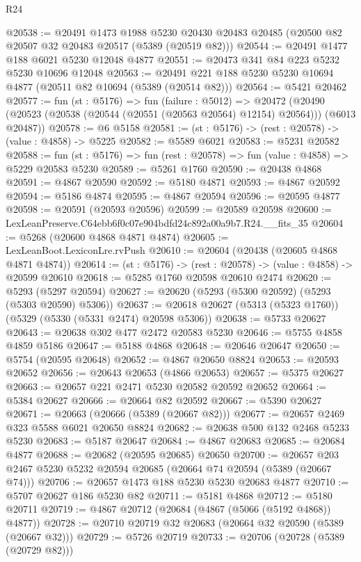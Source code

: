 \begin{lexlean}{R24}
\begin{coremodule}
@20538 := @20491
    @1473
    @1988
    @5230
    @20430
    @20483
    @20485
    (@20500 @82 @20507 @32 @20483 @20517 (@5389 (@20519 @82)))
@20544 := @20491 @1477 @188 @6021 @5230 @12048 @4877
@20551 := @20473 @341 @84 @223 @5232 @5230 @10696 @12048
@20563 := @20491 @221 @188 @5230 @5230 @10694 @4877 (@20511 @82 @10694 (@5389 (@20514 @82)))
@20564 := @5421 @20462
@20577 := fun (st : @5176) =>
  fun (failure : @5012) =>
  @20472 (@20490 (@20523 (@20538 (@20544 (@20551 (@20563 @20564) @12154) @20564))) (@6013 @20487))
@20578 := @6 @5158
@20581 := (st : @5176) -> (rest : @20578) -> (value : @4858) -> @5225
@20582 := @5589 @6021
@20583 := @5231 @20582
@20588 := fun (st : @5176) => fun (rest : @20578) => fun (value : @4858) => @5229 @20583 @5230
@20589 := @5261 @1760
@20590 := @20438 @4868
@20591 := @4867 @20590
@20592 := @5180 @4871
@20593 := @4867 @20592
@20594 := @5186 @4874
@20595 := @4867 @20594
@20596 := @20595 @4877
@20598 := @20591 (@20593 @20596)
@20599 := @20589 @20598
@20600 := LexLeanPreserve.C64ebb6f0c07e904bdfd24c892a00a9b7.R24.__fits_35
@20604 := @5268 (@20600 @4868 @4871 @4874)
@20605 := LexLeanBoot.LexiconLre.rvPush
@20610 := @20604 (@20438 (@20605 @4868 @4871 @4874))
@20614 := (st : @5176) -> (rest : @20578) -> (value : @4858) -> @20599 @20610
@20618 := @5285 @1760 @20598 @20610 @2474
@20620 := @5293 (@5297 @20594)
@20627 := @20620 (@5293 (@5300 @20592) (@5293 (@5303 @20590) @5306))
@20637 := @20618 @20627 (@5313 (@5323 @1760)) (@5329 (@5330 (@5331 @2474) @20598 @5306))
@20638 := @5733 @20627
@20643 := @20638 @302 @477 @2472 @20583 @5230
@20646 := @5755 @4858 @4859 @5186
@20647 := @5188 @4868
@20648 := @20646 @20647
@20650 := @5754 (@20595 @20648)
@20652 := @4867 @20650 @8824
@20653 := @20593 @20652
@20656 := @20643 @20653 (@4866 @20653)
@20657 := @5375 @20627
@20663 := @20657 @221 @2471 @5230 @20582 @20592 @20652
@20664 := @5384 @20627
@20666 := @20664 @82 @20592
@20667 := @5390 @20627
@20671 := @20663 (@20666 (@5389 (@20667 @82)))
@20677 := @20657 @2469 @323 @5588 @6021 @20650 @8824
@20682 := @20638 @500 @132 @2468 @5233 @5230
@20683 := @5187 @20647
@20684 := @4867 @20683
@20685 := @20684 @4877
@20688 := @20682 (@20595 @20685) @20650
@20700 := @20657 @203 @2467 @5230 @5232 @20594 @20685 (@20664 @74 @20594 (@5389 (@20667 @74)))
@20706 := @20657 @1473 @188 @5230 @5230 @20683 @4877
@20710 := @5707 @20627 @186 @5230 @82
@20711 := @5181 @4868
@20712 := @5180 @20711
@20719 := @4867 @20712 (@20684 (@4867 (@5066 (@5192 @4868)) @4877))
@20728 := @20710 @20719 @32 @20683 (@20664 @32 @20590 (@5389 (@20667 @32)))
@20729 := @5726 @20719
@20733 := @20706 (@20728 (@5389 (@20729 @82)))

\end{coremodule}
\end{lexlean}
